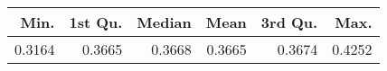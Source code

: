 \begin{table}[ht]
\centering
\begin{tabular}{rrrrrr}
  \hline
Min. & 1st Qu. & Median & Mean & 3rd Qu. & Max. \\ 
  \hline
0.3164 & 0.3665 & 0.3668 & 0.3665 & 0.3674 & 0.4252 \\ 
   \hline
\end{tabular}
\end{table}
